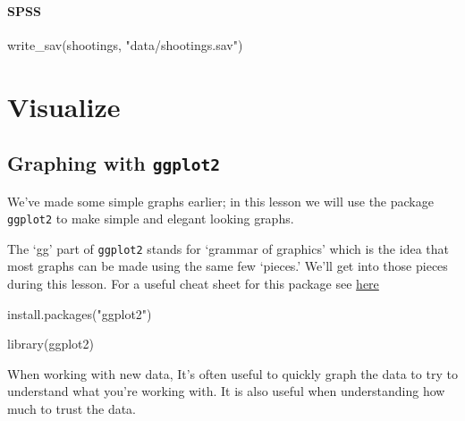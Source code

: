 \documentclass[
  12pt,
]{book}
\newenvironment{Shaded}{\begin{snugshade}}{\end{snugshade}}
\newcommand{\FunctionTok}[1]{\textcolor[rgb]{0,0,0}{#1}}
\newcommand{\NormalTok}[1]{#1}
\newcommand{\StringTok}[1]{\textcolor[rgb]{0.5,0.5,0.5}{#1}}
\begin{document}
\hypertarget{spss-1}{%
\subsection{SPSS}\label{spss-1}}

\begin{Shaded}
\begin{Highlighting}[]
\FunctionTok{write\_sav}\NormalTok{(shootings, }\StringTok{"data/shootings.sav"}\NormalTok{)}
\end{Highlighting}
\end{Shaded}

\hypertarget{part-visualize}{%
\part{Visualize}\label{part-visualize}}

\hypertarget{graphing-intro}{%
\chapter{\texorpdfstring{Graphing with \texttt{ggplot2}}{Graphing with ggplot2}}\label{graphing-intro}}

We've made some simple graphs earlier; in this lesson we will use the package \texttt{ggplot2} to make simple and elegant looking graphs.

The `gg' part of \texttt{ggplot2} stands for `grammar of graphics' which is the idea that most graphs can be made using the same few `pieces.' We'll get into those pieces during this lesson. For a useful cheat sheet for this package see \href{https://www.rstudio.com/wp-content/uploads/2015/03/ggplot2-cheatsheet.pdf}{here}

\begin{Shaded}
\begin{Highlighting}[]
\FunctionTok{install.packages}\NormalTok{(}\StringTok{"ggplot2"}\NormalTok{)}
\end{Highlighting}
\end{Shaded}

\begin{Shaded}
\begin{Highlighting}[]
\FunctionTok{library}\NormalTok{(ggplot2)}
\end{Highlighting}
\end{Shaded}

When working with new data, It's often useful to quickly graph the data to try to understand what you're working with. It is also useful when understanding how much to trust the data.
\end{document}
